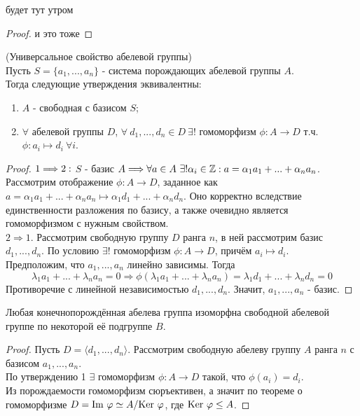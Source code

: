 \begin{consequensenum}
    будет тут утром
\end{consequensenum}
\begin{proof}
    и это тоже
\end{proof}
\begin{subtheoremnum}(Универсальное свойство абелевой группы)\\
    Пусть $S = \{a_1,...,a_n\}$ - система порождающих абелевой группы $A$.\\
    Тогда следующие утверждения эквивалентны:
    \begin{enumerate}
        \item $A$ - свободная с базисом $S$;
        \item $\forall$ абелевой группы $D$, $\forall \ d_1,...,d_n \in D \ \exists!$ гомоморфизм $\phi: A\rightarrow D$ т.ч. $\phi: a_i \mapsto d_i \  \forall i$. 
    \end{enumerate} 
\end{subtheoremnum}
\begin{proof}
    $ \\ 1 \Longrightarrow 2:$  $S$ - базис $A \Longrightarrow \forall a \in A \ \exists! \alpha_i  \in \Z : a = \alpha_1a_1 + ... + \alpha_na_n$.\\
    Рассмотрим отображение $\phi: A \rightarrow D$, заданное как $a = \alpha_1a_1 + ... + \alpha_na_n \mapsto \alpha_1d_1 + ... + \alpha_nd_n$. Оно корректно вследствие единственности разложения по базису, а также очевидно является гомоморфизмом с нужным свойством.\\
    $2 \Longrightarrow 1$. Рассмотрим свободную группу $D$ ранга $n$, в ней рассмотрим базис $d_1,...,d_n$. По условию $\exists!$ гомоморфизм $\phi: A \rightarrow D$, причём $a_i \mapsto d_i$.\\
    Предположим, что $a_1,...,a_n$ линейно зависимы. Тогда \[\lambda_1a_1 +...+\lambda_na_n = 0 \Longrightarrow \phi(\lambda_1a_1 +...+\lambda_na_n) = \lambda_1d_1 +...+\lambda_nd_n = 0\] 
    Противоречие с линейной независимостью $d_1,...,d_n$. Значит, $a_1,...,a_n$ - базис.
\end{proof}
\begin{consequensenum}
    Любая конечнопорождённая абелева группа изоморфна свободной абелевой группе по некоторой её подгруппе $B$.
\end{consequensenum}
\begin{proof}
    Пусть $D = \langle d_1,...,d_n \rangle$. Рассмотрим свободную абелеву группу $A$ ранга $n$ с базисом $a_1,...,a_n$. \\
    По утверждению 1 $\exists$ гомоморфизм $\phi: A \rightarrow D$ такой, что $\phi(a_i) = d_i$.\\
    Из порождаемости гомоморфизм сюръективен, а значит по теореме о гомоморфизме $D = \textup{Im }\phi \simeq A/\textup{Ker }\phi$, где $\textup{Ker }\phi \leq A$. 
\end{proof}
